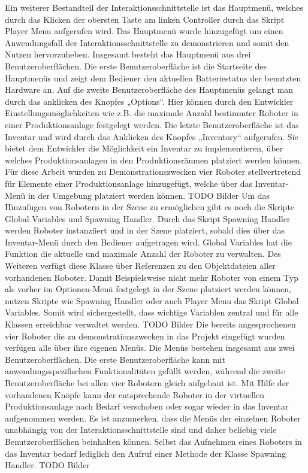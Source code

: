 Ein weiterer Bestandteil der Interaktionsschnittstelle ist das Hauptmenü, welches durch das Klicken der obersten Taste am linken Controller durch das Skript Player Menu aufgerufen wird. Das Hauptmenü wurde hinzugefügt um einen Anwendungsfall der Interaktionsschnittstelle zu demonstrieren und somit den Nutzen hervorzuheben. Insgesamt besteht das Hauptmenü aus drei Benutzeroberflächen. Die erste Benutzeroberfläche ist die Startseite des Hauptmenüs und zeigt dem Bediener den aktuellen Batteriestatus der benutzten Hardware an. Auf die zweite Benutzeroberfläche des Hauptmenüs gelangt man durch das anklicken des Knopfes „Options“. Hier können durch den Entwickler Einstellungsmöglichkeiten wie z.B. die maximale Anzahl bestimmter Roboter in einer Produktionsanlage festgelegt werden. Die letzte Benutzeroberfläche ist das Inventar und wird durch das Anklicken des Knopfes „Inventory“ aufgerufen. Sie bietet dem Entwickler die Möglichkeit ein Inventar zu implementieren, über welches Produktionsanlagen in den Produktionsräumen platziert werden können. Für diese Arbeit wurden zu Demonstrationszwecken vier Roboter stellvertretend für Elemente einer Produktionsanlage hinzugefügt, welche über das Inventar-Menü in der Umgebung platziert werden können.
\newline TODO Bilder
\newline\newline
Um das Hinzufügen von Robotern in der Szene zu ermöglichen gibt es noch die Skripte Global Variables und Spawning Handler. Durch das Skript Spawning Handler werden Roboter instanziiert und in der Szene platziert, sobald dies über das Inventar-Menü durch den Bediener aufgetragen wird. Global Variables hat die Funktion die aktuelle und maximale Anzahl der Roboter zu verwalten. Des Weiteren verfügt diese Klasse über Referenzen zu den Objektdateien aller vorhandenen Roboter. Damit Beispielsweise nicht mehr Roboter von einem Typ als vorher im Optionen-Menü festgelegt in der Szene platziert werden können, nutzen Skripte wie Spawning Handler oder auch Player Menu das Skript Global Variables. Somit wird sichergestellt, dass wichtige Variablen zentral und für alle Klassen erreichbar verwaltet werden.
\newline TODO Bilder
\newline\newline
Die bereits angesprochenen vier Roboter die zu demonstrationszwecken in das Projekt eingefügt wurden verfügen alle über ihre eigenen Menüs. Die Menüs bestehen insgesamt aus zwei Benutzeroberflächen. Die erste Benutzeroberfläche kann mit anwendungsspezifischen Funktionalitäten gefüllt werden, während die zweite Benutzeroberfläche bei allen vier Robotern gleich aufgebaut ist. Mit Hilfe der vorhandenen Knöpfe kann der entsprechende Roboter in der virtuellen Produktionsanlage nach Bedarf verschoben oder sogar wieder in das Inventar aufgenommen werden. Es ist anzumerken, dass die Menüs der einzelnen Roboter unabhängig von der Interaktionsschnittstelle sind und daher beliebig viele Benutzeroberflächen beinhalten können. Selbst das Aufnehmen eines Roboters in das Inventar bedarf lediglich den Aufruf einer Methode der Klasse Spawning Handler.
\newline TODO Bilder
